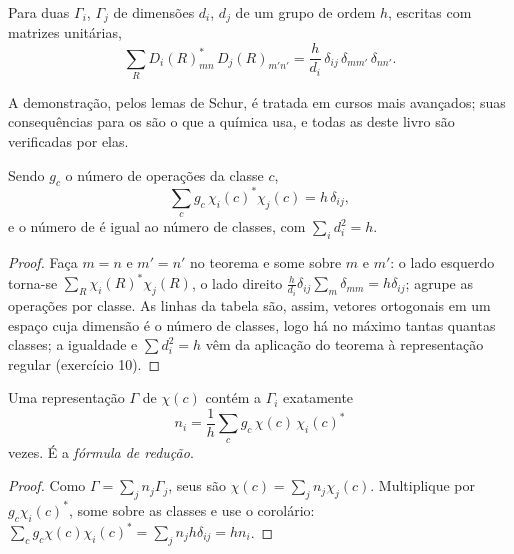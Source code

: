 \begin{theorem}\label{thm:b3:group-theory-applied:great-orthogonality}
Para duas  $\Gamma_i$, $\Gamma_j$ de dimensões $d_i$,
$d_j$ de um grupo de ordem $h$, escritas com matrizes unitárias,
\[
\sum_R D_i(R)_{mn}^*\,D_j(R)_{m'n'} = \frac{h}{d_i}\,\delta_{ij}\,\delta_{mm'}\,\delta_{nn'}.
\]
\end{theorem}
\admitted

A demonstração, pelos lemas de Schur, é tratada em cursos mais avançados; suas
consequências para os  são o que a química usa, e todas as  deste livro são verificadas por elas.

\begin{corollary}\label{cor:b3:group-theory-applied:characters}
Sendo $g_c$ o número de operações da classe $c$,
\[
\sum_cg_c\,\chi_i(c)^*\chi_j(c) = h\,\delta_{ij},
\]
e o número de  é igual ao número de classes,
com $\sum_id_i^2 = h$.
\end{corollary}

\begin{proof}
Faça $m = n$ e $m' = n'$ no teorema e some sobre $m$ e $m'$: o lado esquerdo
torna-se $\sum_R\chi_i(R)^*\chi_j(R)$, o lado direito $\frac{h}{d_i}\delta_{ij}
\sum_{m}\delta_{mm} = h\delta_{ij}$; agrupe as operações por classe. As linhas
da tabela são, assim, vetores ortogonais em um espaço cuja dimensão é o
número de classes, logo há no máximo tantas 
quantas classes; a igualdade e $\sum d_i^2 = h$ vêm da aplicação do teorema
à representação regular (exercício 10).
\end{proof}

\begin{theorem}\label{thm:b3:group-theory-applied:reduction}
Uma representação $\Gamma$ de  $\chi(c)$ contém a  $\Gamma_i$ exatamente
\[
n_i = \frac1h\sum_cg_c\,\chi(c)\,\chi_i(c)^*
\]
vezes. É a \emph{fórmula de redução}.
\end{theorem}

\begin{proof}
Como $\Gamma = \sum_jn_j\Gamma_j$, seus  são $\chi(c) = \sum_jn_j\chi_j(c)$.
Multiplique por $g_c\chi_i(c)^*$, some sobre as classes e use o corolário:
$\sum_cg_c\chi(c)\chi_i(c)^* = \sum_jn_jh\delta_{ij} = hn_i$.
\end{proof}

